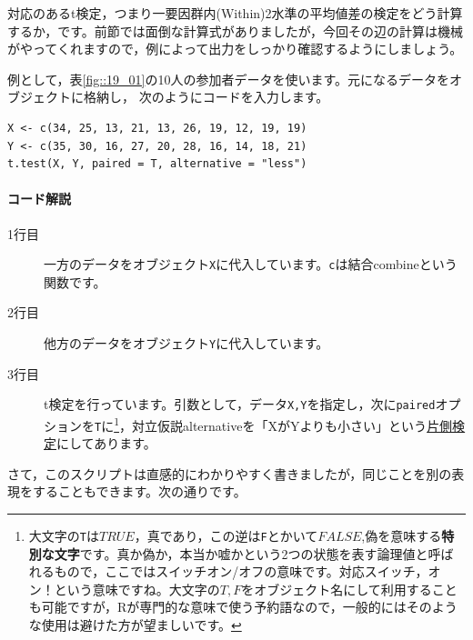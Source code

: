\documentclass{ltjsbook}
\begin{document}
対応のあるt検定，つまり一要因群内(Within)2水準の平均値差の検定をどう計算するか，です。前節では面倒な計算式がありましたが，今回その辺の計算は機械がやってくれますので，例によって出力をしっかり確認するようにしましょう。

例として，表\ref{fig::19_01}の10人の参加者データを使います。元になるデータをオブジェクトに格納し，
次のようにコードを入力します。
\begin{lstlisting}
X <- c(34, 25, 13, 21, 13, 26, 19, 12, 19, 19)
Y <- c(35, 30, 16, 27, 20, 28, 16, 14, 18, 21)
t.test(X, Y, paired = T, alternative = "less")
\end{lstlisting}

\paragraph{コード解説}
\begin{description}
    \item[1行目] 一方のデータをオブジェクト\texttt{X}に代入しています。\texttt{c}は結合combineという関数です。
    \item[2行目] 他方のデータをオブジェクト\texttt{Y}に代入しています。
    \item[3行目] t検定を行っています。引数として，データ\texttt{X,Y}を指定し，次に\texttt{paired}オプションを\texttt{T}に\footnote{大文字の\texttt{T}は$TRUE$，真であり，この逆は\texttt{F}とかいて$FALSE$,偽を意味する\textbf{特別な文字}です。真か偽か，本当か嘘かという2つの状態を表す論理値と呼ばれるもので，ここではスイッチオン/オフの意味です。対応スイッチ，オン！という意味ですね。大文字の$T,F$をオブジェクト名にして利用することも可能ですが，Rが専門的な意味で使う予約語なので，一般的にはそのような使用は避けた方が望ましいです。}，対立仮説alternativeを「XがYよりも小さい」という\underline{片側検定}にしてあります。
\end{description}
さて，このスクリプトは直感的にわかりやすく書きましたが，同じことを別の表現をすることもできます。次の通りです。
\end{document}
